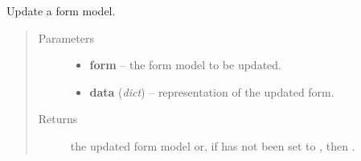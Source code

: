 \documentclass[letterpaper,10pt,english]{sphinxmanual}
\begin{document}
\begin{fulllineitems}
\label{api:onlinelinguisticdatabase.controllers.forms.updateForm}
Update a form model.
\begin{quote}\begin{description}
\item[{Parameters}] \leavevmode\begin{itemize}
\item {} 
\textbf{form} -- the form model to be updated.

\item {} 
\textbf{data} (\emph{dict}) -- representation of the updated form.

\end{itemize}

\item[{Returns}] \leavevmode
the updated form model or, if  has not been set to
, then .

\end{description}\end{quote}

\end{fulllineitems}

\end{document}

